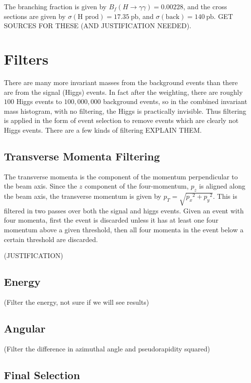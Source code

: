 \documentclass[11pt]{amsart}
\begin{document}
\begin{multicols}{2}
The branching fraction is given by $B_f\left(H\to\gamma\gamma\right) = 0.00228$, and the cross sections are given by $\sigma{\left(\text{H prod}\right)} = \SI{17.35}{\pico\barn}$, and $\sigma{\left(\text{back}\right)} = \SI{140}{\pico\barn}$. GET SOURCES FOR THESE (AND JUSTIFICATION NEEDED).


\section{Filters}

There are many more invariant masses from the background events than there are from the signal (Higgs) events. In fact after the weighting, there are roughly $100$ Higgs events to $100,000,000$ background events, so in the combined invariant mass histogram, with no filtering, the Higgs is practically invisible. Thus filtering is applied in the form of event selection to remove events which are clearly not Higgs events. There are a few kinds of filtering EXPLAIN THEM.

\subsection{Transverse Momenta Filtering}

The transverse momenta is the component of the momentum perpendicular to the beam axis. Since the $z$ component of the four-momentum, $p_z$ is aligned along the beam axis, the transverse momentum is given by $p_T = \sqrt{{p_x}^2 + {p_y}^2}$. This is filtered in two passes over both the signal and higgs events. Given an event with four momenta, first the event is discarded unless it has at least one four momentum above a given threshold, then all four momenta in the event below a certain threshold are discarded.

(JUSTIFICATION)

\subsection{Energy}

(Filter the energy, not sure if we will see results)

\subsection{Angular}

(Filter the difference in azimuthal angle and pseudorapidity squared)

\subsection{Final Selection}


\end{multicols}
\end{document}
